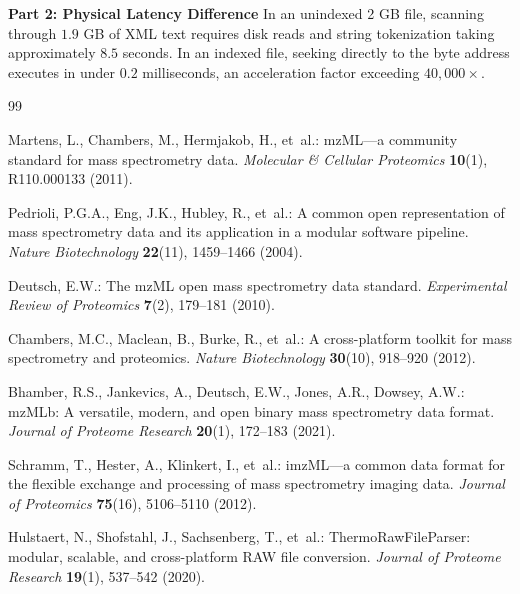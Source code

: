 \documentclass[11pt,twoside,openright]{book}
\begin{document}
\noindent\textbf{Part 2: Physical Latency Difference}\enspace
In an unindexed 2 GB file, scanning through $1.9$ GB of XML text requires disk reads and string tokenization taking approximately $8.5$ seconds. In an indexed file, seeking directly to the byte address executes in under $0.2$ milliseconds, an acceleration factor exceeding $40,000\times$.

\begin{thebibliography}{99}

Martens, L., Chambers, M., Hermjakob, H., et~al.:
\newblock mzML---a community standard for mass spectrometry data.
\newblock \emph{Molecular \& Cellular Proteomics} \textbf{10}(1), R110.000133 (2011).
\newblock {}

Pedrioli, P.G.A., Eng, J.K., Hubley, R., et~al.:
\newblock A common open representation of mass spectrometry data and its application in a modular software pipeline.
\newblock \emph{Nature Biotechnology} \textbf{22}(11), 1459--1466 (2004).
\newblock {}

Deutsch, E.W.:
\newblock The mzML open mass spectrometry data standard.
\newblock \emph{Experimental Review of Proteomics} \textbf{7}(2), 179--181 (2010).
\newblock {}

Chambers, M.C., Maclean, B., Burke, R., et~al.:
\newblock A cross-platform toolkit for mass spectrometry and proteomics.
\newblock \emph{Nature Biotechnology} \textbf{30}(10), 918--920 (2012).
\newblock {}

Bhamber, R.S., Jankevics, A., Deutsch, E.W., Jones, A.R., Dowsey, A.W.:
\newblock mzMLb: A versatile, modern, and open binary mass spectrometry data format.
\newblock \emph{Journal of Proteome Research} \textbf{20}(1), 172--183 (2021).
\newblock {}

Schramm, T., Hester, A., Klinkert, I., et~al.:
\newblock imzML---a common data format for the flexible exchange and processing of mass spectrometry imaging data.
\newblock \emph{Journal of Proteomics} \textbf{75}(16), 5106--5110 (2012).
\newblock {}

Hulstaert, N., Shofstahl, J., Sachsenberg, T., et~al.:
\newblock ThermoRawFileParser: modular, scalable, and cross-platform RAW file conversion.
\newblock \emph{Journal of Proteome Research} \textbf{19}(1), 537--542 (2020).
\newblock {}


\end{thebibliography}
\end{document}
